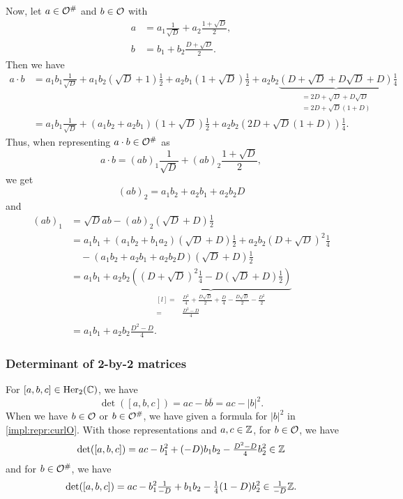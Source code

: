 Now, let $a \in \mathcal{O}^\#$ and $b \in \mathcal{O}$ with
\begin{align*}
a &= a_1 \frac{1}{\sqrt{D}} + a_2 \frac{1 + \sqrt{D}} {2} , \\
b &= b_1 + b_2 \frac{D + \sqrt{D}} {2} .
\end{align*}
Then we have
\begin{align*}
a \cdot b &= a_1 b_1 \tfrac{1}{\sqrt{D}} + a_1 b_2 (\sqrt{D} + 1) \tfrac{1}{2}
+ a_2 b_1 (1 + \sqrt{D}) \tfrac{1}{2} + a_2 b_2
\underbrace{(D + \sqrt{D} + D \sqrt{D} + D)}_{
\begin{aligned}
= 2D + \sqrt{D} + D \sqrt{D} \\
= 2D + \sqrt{D} (1 + D)
\end{aligned}
}
\tfrac{1}{4} \\
&= a_1 b_1 \tfrac{1}{\sqrt{D}} + (a_1 b_2 + a_2 b_1) (1 + \sqrt{D}) \tfrac{1}{2}
+ a_2 b_2 (2D + \sqrt{D}(1 + D)) \tfrac{1}{4} .
\end{align*}
Thus, when representing $a \cdot b \in \mathcal{O}^\#$ as
\[ a \cdot b = (ab)_1 \frac{1}{\sqrt{D}} + (ab)_2 \frac{1 + \sqrt{D}} {2} , \]
we get
\[ (ab)_2 = a_1 b_2 + a_2 b_1 + a_2 b_2 D \]
and
\begin{align*}
(ab)_1 &= \sqrt{D} ab - (ab)_2 (\sqrt{D} + D) \tfrac{1}{2} \\
&= a_1 b_1 + (a_1 b_2 + b_1 a_2) (\sqrt{D} + D) \tfrac{1}{2} + a_2 b_2 (D + \sqrt{D})^2 \tfrac{1}{4} \\
&\quad - (a_1 b_2 + a_2 b_1 + a_2 b_2 D) (\sqrt{D} + D) \tfrac{1}{2} \\
&= a_1 b_1 + a_2 b_2 \underbrace{( (D+\sqrt{D})^2 \tfrac{1}{4} - D(\sqrt{D}+D)\tfrac{1}{2} )}_{
\begin{aligned}[l]
=& \tfrac{D^2}{4} + \tfrac{D\sqrt{D}}{2} + \tfrac{D}{4} - \tfrac{D\sqrt{D}}{2} - \tfrac{D^2}{2} \\
=& \tfrac{D^2 - D}{4}
\end{aligned}
} \\
&= a_1 b_1 + a_2 b_2 \frac{D^2 - D}{4} .
\end{align*}

\subsubsection{Determinant of 2-by-2 matrices}
\label{detCurlO}
For $[a,b,c] \in \operatorname{Her}_2(\mathbb{C})$, we have
\[ \det([a,b,c]) = ac - b \overline{b} = ac - |b|^2 . \]
%
When we have $b \in \mathcal{O}$ or $b \in \mathcal{O}^\#$, we have given a formula for $|b|^2$ in \cref{impl:repr:curlO}. With those representations and $a,c \in \mathbb{Z}$, for $b \in \mathcal{O}$, we have
\[ \det([a,b,c]) = a c -  b_1^2 + (-D) b_1 b_2 - \tfrac{D^2-D}{4} b_2^2 \in \mathbb{Z} \]
and for $b \in \mathcal{O}^\#$, we have
\[ \det([a,b,c]) = a c - b_1^2 \tfrac{1}{-D} + b_1 b_2 - \tfrac{1}{4} (1-D) b_2^2 \in \tfrac{1}{-D} \mathbb{Z} . \]

